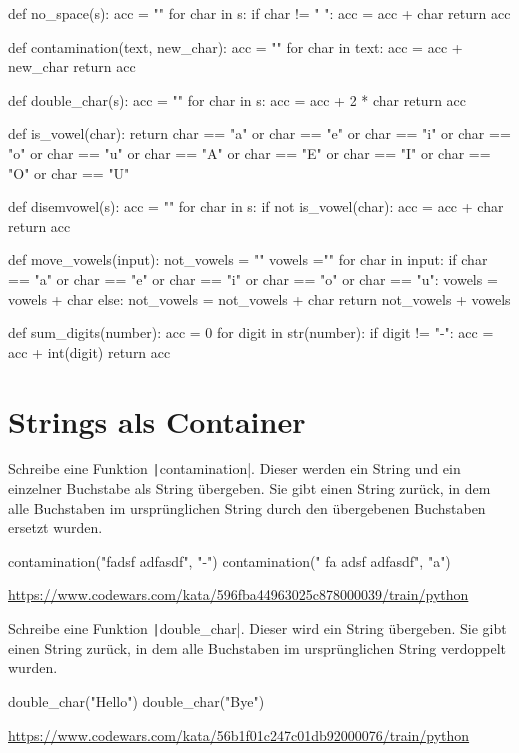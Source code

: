 \documentclass[class=scrartcl, crop=false]{standalone}
\newcommand{\expandpyconc}[1]{\expandafter\reallyexpandpyconc\expandafter{#1}}
\newcommand{\reallyexpandpyconc}[1]{\pyconc{exec(compile(open('#1', 'rb').read(), '#1', 'exec'))}}
\newenvironment{pyconcodeblck}[1]
{\newcommand{\snippetfile}{snippet-#1.py}
	\VerbatimEnvironment
	\begin{VerbatimOut}{\snippetfile}}
	{\end{VerbatimOut}
	\expandpyconc{\snippetfile}}
\begin{document}
\begin{pyconcodeblck}{strings_als_container}
def no_space(s):
    acc = ""
    for char in s:
        if char != " ":
            acc = acc + char
    return acc

def contamination(text, new_char):
    acc = ""
    for char in text:
        acc = acc + new_char
    return acc

def double_char(s):
    acc = ""
    for char in s:
        acc = acc + 2 * char
    return acc

def is_vowel(char):
    return char == "a" or char == "e" or char == "i" or char == "o" or char == "u" or char == "A" or char == "E" or char == "I" or char == "O" or char == "U"


def disemvowel(s):
    acc = ""
    for char in s:
        if not is_vowel(char):
            acc = acc + char
    return acc

def move_vowels(input): 
    not_vowels = ""
    vowels =""
    for char in input:
        if char == "a" or char == "e" or char == "i" or char == "o" or char == "u":
            vowels = vowels + char
        else:
            not_vowels = not_vowels + char
    return not_vowels + vowels
            
def sum_digits(number):
    acc = 0
    for digit in str(number):
        if digit != "-":
            acc = acc + int(digit)
    return acc
                    
\end{pyconcodeblck}
\section{Strings als Container}
\begin{aufgabe}
Schreibe eine Funktion \texttt|contamination|. Dieser werden ein String und ein einzelner Buchstabe als String übergeben. Sie gibt einen String zurück, in dem alle Buchstaben im ursprünglichen String durch den übergebenen Buchstaben ersetzt wurden.

\begin{pyconsole}
contamination("fadsf  adfasdf", "-")
contamination("  fa adsf  adfasdf", "a")
\end{pyconsole}


\url{https://www.codewars.com/kata/596fba44963025c878000039/train/python}
\end{aufgabe}



\begin{aufgabe}
Schreibe eine Funktion \texttt|double_char|. Dieser wird ein String übergeben. Sie gibt einen String zurück, in dem alle Buchstaben im ursprünglichen String verdoppelt wurden.

\begin{pyconsole}
double_char("Hello")
double_char("Bye")
\end{pyconsole}


\url{https://www.codewars.com/kata/56b1f01c247c01db92000076/train/python}
\end{aufgabe}
\end{document}
